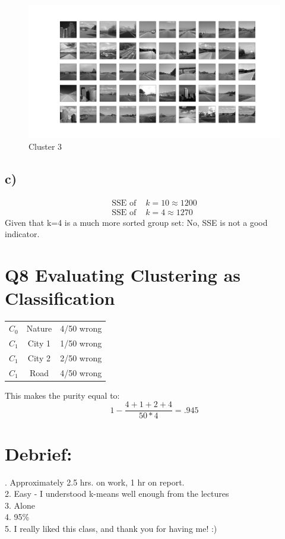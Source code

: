\documentclass{article}
\begin{document}
        \begin{figure}[!h]
            \centering
            \includegraphics[width=\textwidth]{"k_4_3.png"}
            \caption{Cluster 3}
        \end{figure}  
        \clearpage
        \subsection*{c)}
        \begin{align*}
            \text{SSE of } &k=10 \approx 1200\\
            \text{SSE of } &k=4 \approx 1270
        \end{align*}
        Given that k=4 is a much more sorted group set: No, SSE is not a good indicator.
        
    
    \section*{Q8 Evaluating Clustering as Classification}
    \begin{center}
        \begin{tabular}{c | c c}
            $C_0$ & Nature & 4/50 wrong\\
            $C_1$ & City 1 & 1/50 wrong\\
            $C_1$ & City 2 & 2/50 wrong\\
            $C_1$ & Road & 4/50 wrong
        \end{tabular}
    \end{center}
    \qquad This makes the purity equal to:
    \begin{equation*}
        1-\frac{4+1+2+4}{50*4} = .945
    \end{equation*}
    \section*{Debrief:}
    . Approximately 2.5 hrs. on work, 1 hr on report.\\
    2. Easy - I understood k-means well enough from the lectures\\
    3. Alone\\
    4. 95\%\\
    5. I really liked this class, and thank you for having me! :)
\end{document}

